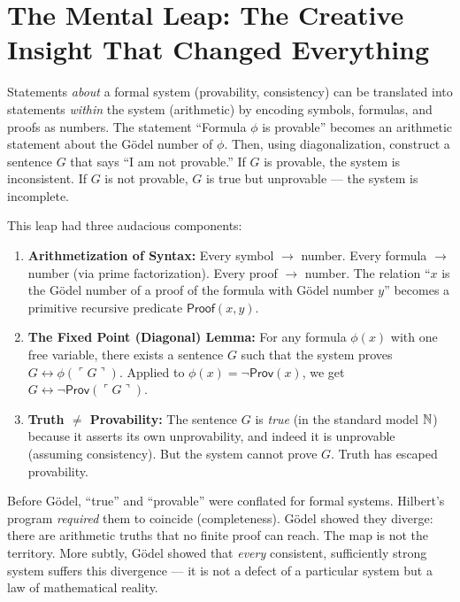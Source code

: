 \section{The Mental Leap: The Creative Insight That Changed Everything}
\label{sec:godel:leap}

Statements \emph{about} a formal system (provability, consistency) can be translated into statements \emph{within} the system (arithmetic) by encoding symbols, formulas, and proofs as numbers. The statement ``Formula $\phi$ is provable'' becomes an arithmetic statement about the Gödel number of $\phi$. Then, using diagonalization, construct a sentence $G$ that says ``I am not provable.'' If $G$ is provable, the system is inconsistent. If $G$ is not provable, $G$ is true but unprovable --- the system is incomplete.

This leap had three audacious components:

\begin{enumerate}
\item \textbf{Arithmetization of Syntax:} Every symbol $\to$ number. Every formula $\to$ number (via prime factorization). Every proof $\to$ number. The relation ``$x$ is the Gödel number of a proof of the formula with Gödel number $y$'' becomes a primitive recursive predicate $\mathsf{Proof}(x, y)$.

\item \textbf{The Fixed Point (Diagonal) Lemma:} For any formula $\phi(x)$ with one free variable, there exists a sentence $G$ such that the system proves $G \leftrightarrow \phi(\ulcorner G \urcorner)$. Applied to $\phi(x) = \neg \mathsf{Prov}(x)$, we get $G \leftrightarrow \neg \mathsf{Prov}(\ulcorner G \urcorner)$.

\item \textbf{Truth $\neq$ Provability:} The sentence $G$ is \emph{true} (in the standard model $\mathbb{N}$) because it asserts its own unprovability, and indeed it is unprovable (assuming consistency). But the system cannot prove $G$. Truth has escaped provability.
\end{enumerate}

Before Gödel, ``true'' and ``provable'' were conflated for formal systems. Hilbert's program \emph{required} them to coincide (completeness). Gödel showed they diverge: there are arithmetic truths that no finite proof can reach. The map is not the territory. More subtly, Gödel showed that \emph{every} consistent, sufficiently strong system suffers this divergence --- it is not a defect of a particular system but a law of mathematical reality.

